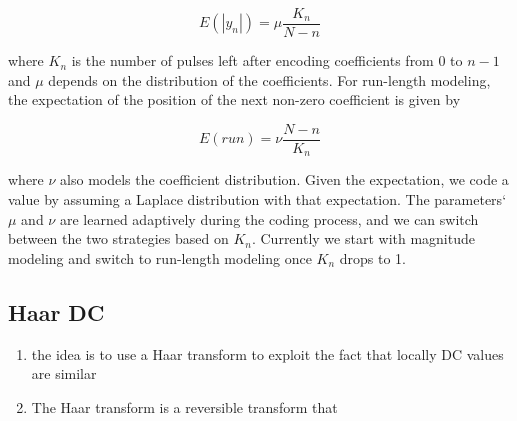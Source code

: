 \documentclass[conference, 10pt]{IEEEtran}
\begin{document}
\begin{equation}
E\left(\left|y_n\right|\right) =  \mu\frac{K_{n}}{N-n}
\end{equation}

where $K_{n}$ is the number of pulses left after encoding coefficients from $0$
 to $n-1$ and $\mu$ depends on the distribution of the coefficients.
For run-length modeling, the expectation of the position of the next non-zero
 coefficient is given by

\begin{equation}
E\left(run\right)=\nu\frac{N-n}{K_{n}}
\end{equation}

 where $\nu$ also models the coefficient distribution.
Given the expectation, we code a value by assuming a Laplace distribution with
 that expectation.
The parameters`$\mu$ and $\nu$ are learned adaptively during the coding process,
 and we can switch between the two strategies based on $K_{n}$.
Currently we start with magnitude modeling and switch to run-length modeling
 once $K_{n}$ drops to 1.

%
%
%
%

\subsection{Haar DC}
\label{sec:haar_dc}

\begin{enumerate}
\item the idea is to use a Haar transform to exploit the fact that locally DC values are similar
\item The Haar transform is a reversible transform that 
\end{enumerate}
\end{document}

